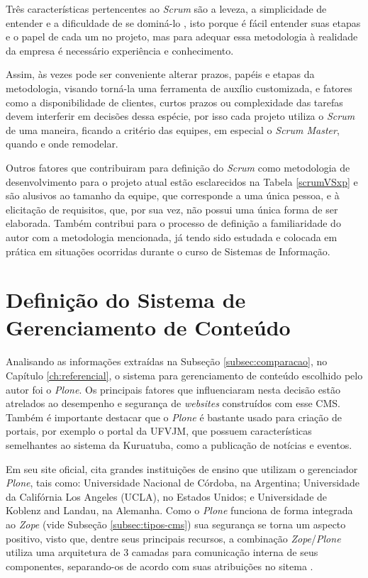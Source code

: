 Três características pertencentes ao \textit{Scrum} são a leveza, a simplicidade de entender e a dificuldade de se dominá-lo , isto porque é fácil entender suas etapas e o papel de cada um no projeto, mas para adequar essa metodologia à realidade da empresa é necessário experiência e conhecimento.

Assim, às vezes pode ser conveniente alterar prazos, papéis e etapas da metodologia, visando torná-la uma ferramenta de auxílio customizada, e fatores como a disponibilidade de clientes, curtos prazos ou complexidade das tarefas devem interferir em decisões dessa espécie, por isso cada projeto utiliza o \textit{Scrum} de uma maneira, ficando a critério das equipes, em especial o \textit{Scrum Master}, quando e onde remodelar.

Outros fatores que contribuiram para definição do \textit{Scrum} como metodologia de desenvolvimento para o projeto atual estão esclarecidos na Tabela \ref{scrumVSxp} e são alusivos ao tamanho da equipe, que corresponde a uma única pessoa, e à elicitação de requisitos, que, por sua vez, não possui uma única forma de ser elaborada. Também contribui para o processo de definição a familiaridade do autor com a metodologia mencionada, já tendo sido estudada e colocada em prática em situações ocorridas durante o curso de Sistemas de Informação.


\hspace{2.5cm}
\section{Definição do Sistema de Gerenciamento de Conteúdo}
\label{sec:defCMS}

\hspace{2.5cm}

Analisando as informações extraídas na Subseção \ref{subsec:comparacao}, no Capítulo \ref{ch:referencial}, o sistema para gerenciamento de conteúdo escolhido pelo autor foi o \textit{Plone}. Os principais fatores que influenciaram nesta decisão estão atrelados ao desempenho e segurança de \textit{websites} construídos com esse CMS. Também é importante destacar que o \textit{Plone} é bastante usado para criação de portais, por exemplo o portal da UFVJM, que possuem características semelhantes ao sistema da Kuruatuba, como a publicação de notícias e eventos. 

Em seu site oficial,  cita grandes instituições de ensino que utilizam o gerenciador \textit{Plone}, tais como: Universidade Nacional de Córdoba, na Argentina; Universidade da Califórnia Los Angeles (UCLA), no Estados Unidos; e Universidade de Koblenz and Landau, na Alemanha. Como o \textit{Plone} funciona de forma integrada ao \textit{Zope} (vide Subseção \ref{subsec:tipos-cms}) sua segurança se torna um aspecto positivo, visto que, dentre seus principais recursos, a combinação \textit{Zope}/\textit{Plone} utiliza uma arquitetura de 3 camadas para comunicação interna de seus componentes, separando-os de acordo com suas atribuições no sitema \cite{pastore}. 

